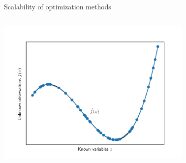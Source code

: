 \documentclass[aspectratio=169]{beamer}
\begin{document}
\begin{frame}{Scalability of optimization methods}
    \begin{columns}
        \begin{column}{0.49\textwidth}
            \centering
            \includegraphics[width=0.75\textwidth]{../img/delaunay_new/inference_1d_pt5-eps-converted-to.pdf}\\
        \end{column}
        \begin{column}{0.49\textwidth}
            \centering

\end{column}
\end{columns}
\end{frame}
\end{document}
